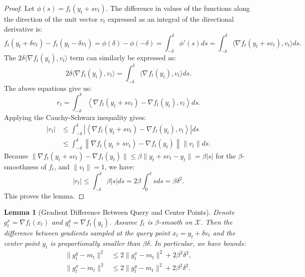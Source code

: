 \documentclass[journal,onecolumn]{IEEEtran}
\newcommand{\cX}{\mathcal{X}}
\theoremstyle{plain}
\newtheorem{lemma}[theorem]{Lemma}
\theoremstyle{definition}
\theoremstyle{remark}
\begin{document}
{\begin{proof}
    Let $\phi(s)=f_t(y_t+sv_t)$. The difference in values of the functions along the direction of the unit vector $v_{t}$ expressed as an integral of the directional derivative is:
    \begin{equation*}
        f_{t}(y_{t}+ \delta v_{t}) - f_{t}(y_{t}- \delta v_{t}) = \phi(\delta) -
        \phi(-\delta) = \int_{-\delta}^{\delta}\phi'(s) ds = \int_{-\delta}^{\delta}
        \langle \nabla f_{t}(y_{t}+ s v_{t}), v_{t}\rangle ds.
    \end{equation*}
    The $2\delta \langle \nabla f_{t}(y_{t}), v_{t}\rangle$ term can similarly be
    expressed as:
    \begin{equation*}
        2\delta \langle \nabla f_{t}(y_{t}), v_{t}\rangle = \int_{-\delta}^{\delta}
        \langle \nabla f_{t}(y_{t}), v_{t}\rangle ds.
    \end{equation*}
    The above equations give us:
    \begin{equation*}
        r_{t}= \int_{-\delta}^{\delta}\left\langle \nabla f_{t}(y_{t}+ s v_{t}) -
        \nabla f_{t}(y_{t}), v_{t}\right\rangle ds.
    \end{equation*}
    Applying the Cauchy-Schwarz inequality gives:
    \begin{align*}
        |r_{t}| & \le \int_{-\delta}^{\delta}\left| \left\langle \nabla f_{t}(y_{t}+ s v_{t}) - \nabla f_{t}(y_{t}), v_{t}\right\rangle \right| ds \\
                & \le \int_{-\delta}^{\delta}\left\| \nabla f_{t}(y_{t}+ s v_{t}) - \nabla f_{t}(y_{t}) \right\| \|v_{t}\| ds.
    \end{align*}
    Because $\|\nabla f_{t}(y_{t}+ sv_{t}) - \nabla f_{t}(y_{t})\| \le \beta \| y_{t}+ sv_{t} - y_{t}\| = \beta|s|$ for the $\beta$-smoothness of $f_{t}$, and $\|v_{t}\|=1$, we have:
    \begin{equation*}
        |r_{t}| \le \int_{-\delta}^{\delta}\beta |s| ds = 2\beta \int_{0}^{\delta}
        s ds = \beta \delta^{2}.
    \end{equation*}
    This proves the lemma.
\end{proof}

\begin{lemma}[Gradient Difference Between Query and Center Points]
    \label{lem:gradient-stability} Denote $g_t^x=\nabla f_t(x_t)$ and $g_t^y=\nabla f_t(y_t)$. Assume $f_{t}$ is $\beta$-smooth on $\cX$.
    Then the difference between gradients sampled at the query point $x_{t}=y_{t}+\delta v_{t}$ and the center point $y_{t}$ is proportionally smaller than $\beta\delta$. In particular, we have bounds:
    \begin{align*}
        \|g_{t}^{y}- m_{t}\|^{2} & \le 2\|g_{t}^{x}- m_{t}\|^{2}+ 2\beta^{2}\delta^{2}, \\
        \|g_{t}^{x}- m_{t}\|^{2} & \le 2\|g_{t}^{y}- m_{t}\|^{2}+ 2\beta^{2}\delta^{2}.
    \end{align*}
\end{lemma}

}
\end{document}
